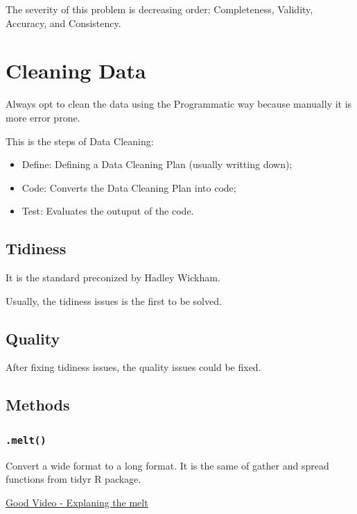 \documentclass[]{book}
\providecommand{\tightlist}{%
  \setlength{\itemsep}{0pt}\setlength{\parskip}{0pt}}
\begin{document}
The severity of this problem is decreasing order: Completeness,
Validity, Accuracy, and Consistency.

\section{Cleaning Data}\label{cleaning-data}

Always opt to clean the data using the Programmatic way because manually
it is more error prone.

This is the steps of Data Cleaning:

\begin{itemize}
\tightlist
\item
  Define: Defining a Data Cleaning Plan (usually writting down);
\item
  Code: Converts the Data Cleaning Plan into code;
\item
  Test: Evaluates the outuput of the code.
\end{itemize}

\subsection{Tidiness}\label{tidiness-1}

It is the standard preconized by Hadley Wickham.

Usually, the tidiness issues is the first to be solved.

\subsection{Quality}\label{quality-1}

After fixing tidiness issues, the quality issues could be fixed.

\subsection{Methods}\label{methods}

\subsubsection{\texorpdfstring{\texttt{.melt()}}{.melt()}}\label{melt}

Convert a wide format to a long format. It is the same of gather and
spread functions from tidyr R package.

\href{https://www.youtube.com/watch?v=qOkj5zOHwRE}{Good Video -
Explaning the melt}
\end{document}
